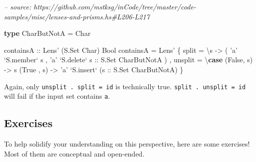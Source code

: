 \documentclass[]{article}
\newenvironment{Shaded}{}{}
\newcommand{\CharTok}[1]{\textcolor[rgb]{0.25,0.44,0.63}{#1}}
\newcommand{\CommentTok}[1]{\textcolor[rgb]{0.38,0.63,0.69}{\textit{#1}}}
\newcommand{\DataTypeTok}[1]{\textcolor[rgb]{0.56,0.13,0.00}{#1}}
\newcommand{\FunctionTok}[1]{\textcolor[rgb]{0.02,0.16,0.49}{#1}}
\newcommand{\KeywordTok}[1]{\textcolor[rgb]{0.00,0.44,0.13}{\textbf{#1}}}
\newcommand{\NormalTok}[1]{#1}
\newcommand{\OtherTok}[1]{\textcolor[rgb]{0.00,0.44,0.13}{#1}}
\begin{document}
\begin{Shaded}
\begin{Highlighting}[]
\CommentTok{-- source: https://github.com/mstksg/inCode/tree/master/code-samples/misc/lenses-and-prisms.hs#L206-L217}

\KeywordTok{type} \DataTypeTok{CharButNotA} \FunctionTok{=} \DataTypeTok{Char}

\OtherTok{containsA ::} \DataTypeTok{Lens'}\NormalTok{ (}\DataTypeTok{S.Set} \DataTypeTok{Char}\NormalTok{) }\DataTypeTok{Bool}
\NormalTok{containsA }\FunctionTok{=} \DataTypeTok{Lens'}
\NormalTok{    \{ split   }\FunctionTok{=}\NormalTok{ \textbackslash{}s }\OtherTok{->}
\NormalTok{        ( }\CharTok{'a'} \OtherTok{`S.member`}\NormalTok{ s}
\NormalTok{        , }\CharTok{'a'} \OtherTok{`S.delete` s      ::} \DataTypeTok{S.Set} \DataTypeTok{CharButNotA}
\NormalTok{        )}
\NormalTok{    , unsplit }\FunctionTok{=}\NormalTok{ \textbackslash{}}\KeywordTok{case}
\NormalTok{        (}\DataTypeTok{False}\NormalTok{, s) }\OtherTok{->}\NormalTok{ s}
\NormalTok{        (}\DataTypeTok{True}\NormalTok{ , s) }\OtherTok{->} \CharTok{'a'} \OtherTok{`S.insert`}\NormalTok{ (}\OtherTok{s ::} \DataTypeTok{S.Set} \DataTypeTok{CharButNotA}\NormalTok{)}
\NormalTok{    \}}
\end{Highlighting}
\end{Shaded}

Again, only \texttt{unsplit\ .\ split\ =\ id} is technically true.
\texttt{split\ .\ unsplit\ =\ id} will fail if the input set contains
\texttt{\textquotesingle{}a\textquotesingle{}}.

\hypertarget{exercises}{%
\subsection{Exercises}\label{exercises}}

To help solidify your understanding on this perspective, here are some
exercises! Most of them are conceptual and open-ended.
\end{document}
